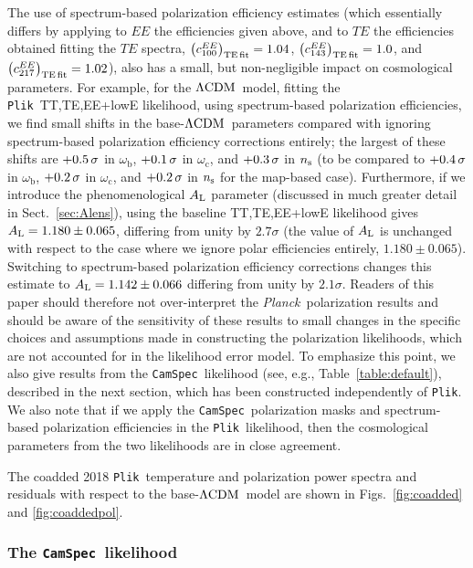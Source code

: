 \documentclass[longauth,traditabstract]{aa}
\def\Planck{\textit{Planck}}
\def\,{\thinspace}
\newcommand{\camspec}{{\tt CamSpec}}
\newcommand{\plik}{{\tt Plik}}
\newcommand{\mksym}[1]{\ifmmode {\rm #1}\else #1\fi}
\newcommand{\TTTEEE}{\mksym{TT,TE,EE}}
\newcommand{\ns}{n_{\rm s}}
\newcommand{\Alens}{A_{\rm L}}
\providecommand{\omb}{\omega_{\mathrm{b}}}
\providecommand{\omc}{\omega_{\mathrm{c}}}
\providecommand{\LCDM}{{$\rm{\Lambda CDM}$}}
\newcommand{\calibC}{\ensuremath{c}}
\newcommand{\Alenssec}{Sect.~\ref{sec:Alens}}
\begin{document}
 The use of spectrum-based polarization efficiency estimates (which essentially differs by applying to $EE$ the
efficiencies given  above, and to $TE$ the efficiencies obtained fitting the $TE$ spectra, $\left(\calibC^{EE}_{100}\right)_{\mathrm{TE \,fit}}=1.04$, $\left(\calibC^{EE}_{143}\right)_{\mathrm{TE \,fit}}=1.0$, and $\left(\calibC^{EE}_{217}\right)_{\mathrm{TE\,fit}}=1.02$), also has a small, but non-negligible impact on cosmological parameters. For example, for the \LCDM\ model, fitting the
 \plik\ \TTTEEE+lowE likelihood, using spectrum-based polarization efficiencies, we find small shifts
in the base-\LCDM\ parameters compared with ignoring spectrum-based polarization efficiency corrections entirely; the largest of these
shifts are $+0.5\,\sigma$ in $\omb$, $+0.1\,\sigma$ in $\omc$, and $+0.3\,\sigma$ in $\ns$ (to be compared to $+0.4\,\sigma$ in $\omb$, $+0.2\,\sigma$ in $\omc$, and $+0.2\,\sigma$ in $\ns$ for the map-based case).
Furthermore, if we introduce the phenomenological $\Alens$ parameter
(discussed in much greater detail in \Alenssec), using the baseline \TTTEEE+lowE likelihood gives
 $\Alens=1.180\pm0.065$,  differing from unity by $2.7\sigma$ (the value of $\Alens$ is unchanged with respect to the case where we ignore polar efficiencies entirely, $1.180\pm 0.065$). Switching to spectrum-based polarization efficiency corrections
changes this estimate to $\Alens=1.142\pm 0.066$ differing from unity by $2.1 \sigma$. Readers of this paper should therefore
not over-interpret the \Planck\ polarization results and should be aware of the
sensitivity of these results to small changes in the specific choices and assumptions
made in constructing the polarization likelihoods, which are not accounted for in the likelihood error model. To emphasize this
point, we also give results from the \camspec\ likelihood (see, e.g., Table~\ref{table:default}), described in the next section, which has been constructed independently of \plik. We also note that if we apply the \camspec\ polarization masks
and spectrum-based polarization efficiencies in the  \plik\ likelihood, then the cosmological parameters from the
two likelihoods are in close agreement.

The coadded 2018 \plik\ temperature and polarization power spectra and residuals with respect to the base-\LCDM\ model are shown in Figs.~\ref{fig:coadded} and \ref{fig:coaddedpol}.




\subsubsection{The \camspec\ likelihood}\label{sec:camspec}
\end{document}
